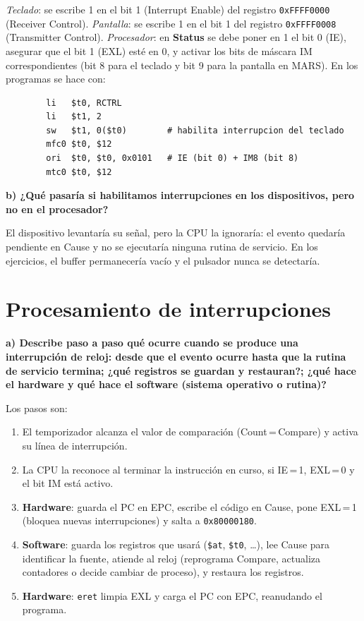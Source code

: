 \documentclass[11pt,a4paper]{article}
\begin{document}
\medskip
\noindent \emph{Teclado}: se escribe 1 en el bit 1 (Interrupt Enable) del registro \texttt{0xFFFF0000} (Receiver Control). \emph{Pantalla}: se escribe 1 en el bit 1 del registro \texttt{0xFFFF0008} (Transmitter Control). \emph{Procesador}: en \textbf{Status} se debe poner en 1 el bit 0 (IE), asegurar que el bit 1 (EXL) esté en 0, y activar los bits de máscara IM correspondientes (bit 8 para el teclado y bit 9 para la pantalla en MARS). En los programas se hace con:

\begin{lstlisting}
        li   $t0, RCTRL
        li   $t1, 2
        sw   $t1, 0($t0)        # habilita interrupcion del teclado
        mfc0 $t0, $12
        ori  $t0, $t0, 0x0101   # IE (bit 0) + IM8 (bit 8)
        mtc0 $t0, $12
\end{lstlisting}

\medskip
\noindent\textbf{b) ¿Qué pasaría si habilitamos interrupciones en los dispositivos, pero no en el procesador?}

\medskip
\noindent El dispositivo levantaría su señal, pero la CPU la ignoraría: el evento quedaría pendiente en Cause y no se ejecutaría ninguna rutina de servicio. En los ejercicios, el buffer permanecería vacío y el pulsador nunca se detectaría.

\section{Procesamiento de interrupciones}

\noindent\textbf{a) Describe paso a paso qué ocurre cuando se produce una interrupción de reloj: desde que el evento ocurre hasta que la rutina de servicio termina; ¿qué registros se guardan y restauran?; ¿qué hace el hardware y qué hace el software (sistema operativo o rutina)?}

\medskip
\noindent Los pasos son:
\begin{enumerate}[leftmargin=2em, label=\arabic*.]
\item El temporizador alcanza el valor de comparación (Count\,=\,Compare) y activa su línea de interrupción.
\item La CPU la reconoce al terminar la instrucción en curso, si IE\,=\,1, EXL\,=\,0 y el bit IM está activo.
\item \textbf{Hardware}: guarda el PC en EPC, escribe el código en Cause, pone EXL\,=\,1 (bloquea nuevas interrupciones) y salta a \texttt{0x80000180}.
\item \textbf{Software}: guarda los registros que usará (\texttt{\$at}, \texttt{\$t0}, \dots), lee Cause para identificar la fuente, atiende al reloj (reprograma Compare, actualiza contadores o decide cambiar de proceso), y restaura los registros.
\item \textbf{Hardware}: \texttt{eret} limpia EXL y carga el PC con EPC, reanudando el programa.
\end{enumerate}
\end{document}
